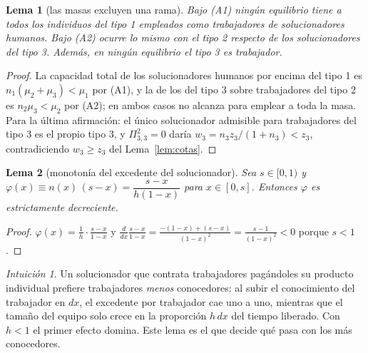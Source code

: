 \documentclass[11pt]{article}
\theoremstyle{plain}
\newtheorem{lema}{Lema}
\theoremstyle{definition}
\theoremstyle{remark}
\newtheorem*{intuicion}{Intuición}
\begin{document}
\begin{lema}[las masas excluyen una rama]\label{lem:masas}
Bajo (A1) ningún equilibrio tiene a todos los individuos del tipo 1 empleados como trabajadores de
solucionadores humanos. Bajo (A2) ocurre lo mismo con el tipo 2 respecto de los solucionadores del
tipo 3. Además, en ningún equilibrio el tipo 3 es trabajador.
\end{lema}
\begin{proof}
La capacidad total de los solucionadores humanos por encima del tipo 1 es $n_1(\mu_2+\mu_3)<\mu_1$ por
(A1), y la de los del tipo 3 sobre trabajadores del tipo 2 es $n_2\mu_3<\mu_2$ por (A2); en ambos
casos no alcanza para emplear a toda la masa. Para la última afirmación: el único solucionador
admisible para trabajadores del tipo 3 es el propio tipo 3, y $\Pi^{2}_{3,3}=0$ daría
$w_3=n_3 z_3/(1+n_3)<z_3$, contradiciendo $w_3\ge z_3$ del Lema~\ref{lem:cotas}.
\end{proof}

\begin{lema}[monotonía del excedente del solucionador]\label{lem:phi}
Sea $s\in[0,1)$ y $\varphi(x)\equiv n(x)\,(s-x)=\dfrac{s-x}{h(1-x)}$ para $x\in[0,s]$. Entonces
$\varphi$ es estrictamente decreciente.
\end{lema}
\begin{proof}
$\varphi(x)=\frac1h\cdot\frac{s-x}{1-x}$ y
$\frac{d}{dx}\frac{s-x}{1-x}=\frac{-(1-x)+(s-x)}{(1-x)^{2}}=\frac{s-1}{(1-x)^{2}}<0$ porque $s<1$.
\end{proof}

\begin{intuicion}
Un solucionador que contrata trabajadores pagándoles su producto individual prefiere trabajadores
\emph{menos} conocedores: al subir el conocimiento del trabajador en $dx$, el excedente por
trabajador cae uno a uno, mientras que el tamaño del equipo solo crece en la proporción $h\,dx$ del
tiempo liberado. Con $h<1$ el primer efecto domina. Este lema es el que decide qué pasa con los más
conocedores.
\end{intuicion}
\end{document}
